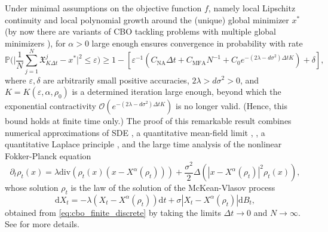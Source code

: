 \documentclass[reqno]{amsart}
\numberwithin{algorithm}{section}
\newcommand{\diff}{\mathrm{d}}
\newcommand{\dv}{\mathrm{div}}
\newcommand{\Xalpha}{{X^\alpha}}
\newcommand{\Xf}{{\mathfrak{X}}}
\begin{document}
{Under minimal assumptions on the objective function $f$, namely local Lipschitz continuity and local polynomial growth around the (unique) global minimizer $x^*$  (by now there are variants of CBO tackling problems with multiple global minimizers \cite{bungert2022polarized,B1-fornasierSun25,huang2025faithful}), for $\alpha>0$ large enough  \cite[Theorem 3.8]{B1-fornasier2021global} ensures convergence in probability with rate
\begin{equation}\label{eq:convprob}
  \mathbb P\Bigg( \big |\frac{1}{N} \sum_{j=1}^N \Xf_{K\Delta t}^j-x^*\big |^2 \leq \varepsilon\Bigg) \geq 1 - \left [ \varepsilon^{-1} (C_{\mathrm{NA}}\Delta t+C_{\mathrm{MFA}} N^{-1}+C_{0}e^{-(2 \lambda - d \sigma^2) \Delta t K}) +\delta \right ],
\end{equation}
where $\varepsilon, \delta$ are arbitrarily small positive accuracies, $2\lambda > d \sigma^2>0$, and $K=K(\varepsilon,\alpha,\rho_0)$ is a determined iteration large enough, beyond which the exponential contractivity $\mathcal O(e^{-(2 \lambda - d \sigma^2) \Delta t K})$ is no longer valid. (Hence, this bound holds at finite time only.)
The proof of this remarkable result combines numerical approximations of SDE \cite{platen1999introduction}, a quantitative mean-field limit \cite[Proposition 3.11]{B1-fornasier2021global}, \cite[Theorem 2.6]{gerber_mean-field_2024}, a quantitative Laplace principle \cite[Proposition 4.5]{B1-fornasier2021global}, and the large time analysis of the nonlinear Fokker-Planck equation 
\begin{equation}\label{eq:FP_CBO}
\partial_t\rho_t(x) = \lambda \dv\left(\rho_t(x)(x-\Xalpha(\rho_t))\right) +\frac{\sigma^2}{2}\Delta( |x-\Xalpha(\rho_t)|^2 \rho_t(x)),
\end{equation}
whose solution $\rho_t$ is the law of the solution of the McKean-Vlasov process
\begin{equation}\tag{CBO}\label{eq:cbo_mf}
    \diff X_t = -\lambda(X_t - \Xalpha(\rho_t)) \diff t + \sigma |X_t - \Xalpha(\rho_t)| \diff B_t,
\end{equation}
obtained from \eqref{eq:cbo_finite_discrete} by taking the limits $\Delta t \to 0$  and $N\to \infty$. See \cite[Theorem 3.7]{B1-fornasier2021global} for more details. \\

}
\end{document}
